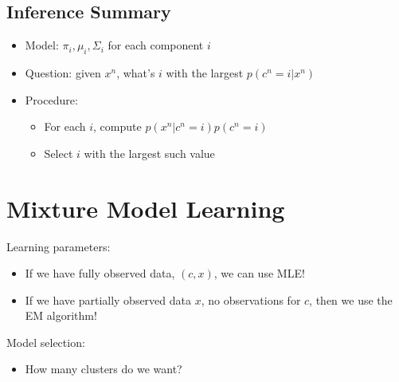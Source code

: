 \documentclass[10pt]{article}
\begin{document}
\subsection*{Inference Summary}
\begin{itemize}
	\item Model: $\pi_i, \mu_i, \Sigma_i$ for each component $i$
	\item Question: given $x^n$, what's $i$ with the largest $p(c^n = i | x^n)$
	\item Procedure:
	\begin{itemize}
	    \item For each $i$, compute $p(x^n | c^n = i) p(c^n = i)$
	    \item Select $i$ with the largest such value
    \end{itemize}
\end{itemize}

\section*{Mixture Model Learning}
Learning parameters:
\begin{itemize}
	\item If we have fully observed data, $(c, x)$, we can use MLE!
	\item If we have partially observed data $x$, no observations for $c$, then we use the EM algorithm!
\end{itemize}
Model selection:
\begin{itemize}
	\item How many clusters do we want?
\end{itemize}
\end{document}
